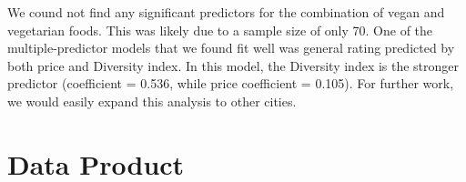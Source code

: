 \documentclass[11pt,twocolumn]{article}
\begin{document}
We cound not find any significant predictors for the combination of vegan and vegetarian foods. This was likely due to a sample size of only 70. One of the multiple-predictor models that we found fit well was general rating predicted by both price and Diversity index. In this model, the Diversity index is the stronger predictor (coefficient = 0.536, while price coefficient = 0.105). For further work, we would easily expand this analysis to other cities.

\section{Data Product}
\end{document}
